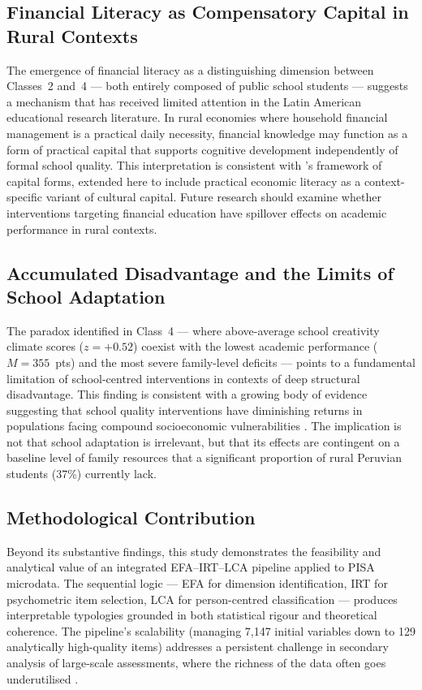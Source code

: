 \documentclass[twocolumn,12pt]{article}
\begin{document}
\subsection{Financial Literacy as Compensatory Capital in Rural Contexts}

The emergence of financial literacy as a distinguishing dimension between
Classes~2 and~4 --- both entirely composed of public school students ---
suggests a mechanism that has received limited attention in the Latin
American educational research literature. In rural economies where household
financial management is a practical daily necessity, financial knowledge may
function as a form of practical capital that supports cognitive development
independently of formal school quality. This interpretation is consistent
with \textcite{bourdieu1986capital}'s framework of capital forms, extended
here to include practical economic literacy as a context-specific variant of
cultural capital. Future research should examine whether interventions
targeting financial education have spillover effects on academic performance
in rural contexts.

\subsection{Accumulated Disadvantage and the Limits of School Adaptation}

The paradox identified in Class~4 --- where above-average
school creativity climate scores ($z = +0.52$) coexist with
the lowest academic performance ($M = 355$~pts) and the
most severe family-level deficits --- points to a
fundamental limitation of school-centred interventions in contexts of
deep structural disadvantage. This finding is consistent with a growing body
of evidence suggesting that school quality interventions have diminishing
returns in populations facing compound socioeconomic vulnerabilities
\parencite{wang2024urbanrural, castro2022bonuses}. The implication is not
that school adaptation is irrelevant, but that its effects are contingent on
a baseline level of family resources that a significant proportion of rural
Peruvian students (37\%) currently lack.

\subsection{Methodological Contribution}

Beyond its substantive findings, this study demonstrates the feasibility and
analytical value of an integrated EFA--IRT--LCA pipeline applied to PISA
microdata. The sequential logic --- EFA for dimension identification, IRT for
psychometric item selection, LCA for person-centred classification ---
produces interpretable typologies grounded in both statistical rigour and
theoretical coherence. The pipeline's scalability (managing 7,147 initial
variables down to 129 analytically high-quality items) addresses a
persistent challenge in secondary analysis of large-scale assessments, where
the richness of the data often goes underutilised \parencite{rutkowski2010secondary}.
\end{document}
